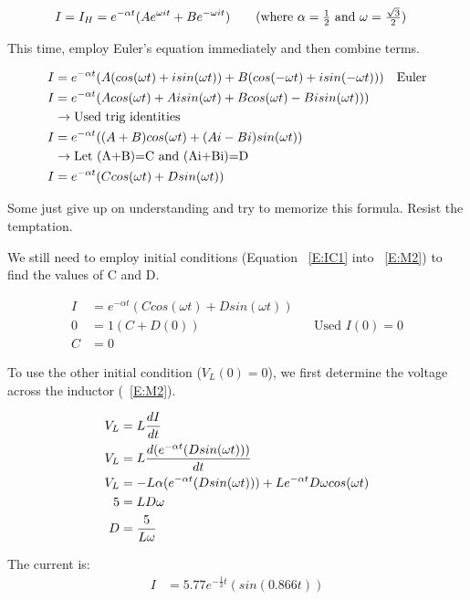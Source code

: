 \begin{align}
I=I_H&=e^{-\alpha t}(Ae^{\omega it}+Be^{-\omega it}) \tag{where $\alpha=\frac{1}{2}$ and $\omega=\frac{\sqrt{3}}{2}$}
\end{align}

This time, employ Euler's equation immediately and then combine terms.

\begin{align}
I&=e^{-\alpha t}(A(cos(\omega t)+isin(\omega t))+B(cos(-\omega t)+isin(-\omega t))) &\text{Euler}\notag\\
I&=e^{-\alpha t}(Acos(\omega t)+Aisin(\omega t)+Bcos(\omega t)-Bisin(\omega t))) \notag\\
&\rightarrow \text{Used trig identities}\\
I&=e^{-\alpha t}((A+B)cos(\omega t)+(Ai-Bi)sin(\omega t)) \notag\\
&\rightarrow\text{Let (A+B)=C and (Ai+Bi)=D} \notag\\
I&=e^{-\alpha t}(Ccos(\omega t)+Dsin(\omega t)) \label{E:M2} 
\end{align}

Some just give up on understanding and try to memorize this formula. Resist the temptation. \par

We still need to employ initial conditions (Equation ~\eqref{E:IC1} into ~\eqref{E:M2}) to find the values of C and D.

\begin{align*}
I&=e^{-\alpha t}(Ccos(\omega t)+Dsin(\omega t))  \\
0&=1(C+D(0)) &&\text{Used $I(0)=0$}\\
C&=0
\end{align*}

To use the other initial condition ($V_L(0)=0$), we first determine the voltage across the inductor (~\eqref{E:M2}).\par

\begin{align}
V_L&=L\frac{dI}{dt} \notag \\
V_L&=L\frac{d(e^{-\alpha t}(Dsin(\omega t)))}{dt} \notag \\
V_L&=-L\alpha(e^{-\alpha t}(Dsin(\omega t)))+Le^{-\alpha t}D\omega cos(\omega t) \notag \\
5 &= LD\omega \notag\\
D &= \frac{5}{L\omega}
\end{align}

The current is:
\begin{align}
I&=5.77e^{-\frac{1}{2} t}(sin(0.866 t)) \label{E:7RLCSOL}
\end{align}

